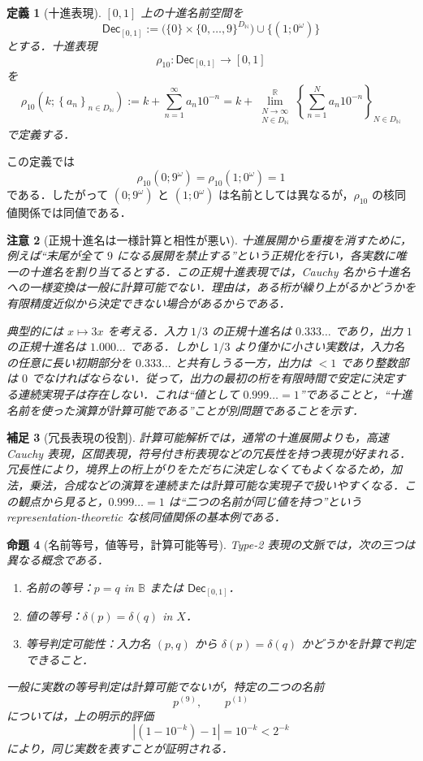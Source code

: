 \documentclass[a4paper,11pt]{ltjsarticle}
\theoremstyle{jpdef}
\newtheorem{definition}{定義}[section]
\newtheorem{remark}[definition]{補足}
\newtheorem{warning}[definition]{注意}
\theoremstyle{jpthm}
\newtheorem{proposition}[definition]{命題}
\newcommand{\N}{\mathbb{N}}
\newcommand{\R}{\mathbb{R}}
\newcommand{\DN}{D_{\N}}
\newcommand{\seq}[2]{\left\{#1\right\}_{#2}}
\newcommand{\Baire}{\mathbb{B}}
\begin{document}
\begin{definition}[十進表現]
\([0,1]\) 上の十進名前空間を
\[
  \mathsf{Dec}_{[0,1]}
  :=\bigl(\{0\}\times\{0,\ldots,9\}^{\DN}\bigr)\cup\{(1;0^\omega)\}
\]
とする．十進表現
\[
  \rho_{10}:\mathsf{Dec}_{[0,1]}\to[0,1]
\]
を
\[
  \rho_{10}(k;\seq{a_n}{n\in\DN})
  := k+\sum_{n=1}^{\infty}a_n10^{-n}
  =k+\lim_{\substack{N\to\infty\\N\in\DN}}^{\R}
      \seq{\sum_{n=1}^{N}a_n10^{-n}}{N\in\DN}
\]
で定義する．
\end{definition}

この定義では
\[
  \rho_{10}(0;9^\omega)=\rho_{10}(1;0^\omega)=1
\]
である．したがって \((0;9^\omega)\) と \((1;0^\omega)\) は名前としては異なるが，\(\rho_{10}\) の核同値関係では同値である．

\begin{warning}[正規十進名は一様計算と相性が悪い]
十進展開から重複を消すために，例えば``末尾が全て \(9\) になる展開を禁止する''という正規化を行い，各実数に唯一の十進名を割り当てるとする．この正規十進表現では，Cauchy 名から十進名への一様変換は一般に計算可能でない．理由は，ある桁が繰り上がるかどうかを有限精度近似から決定できない場合があるからである．

典型的には \(x\mapsto 3x\) を考える．入力 \(1/3\) の正規十進名は \(0.333\ldots\) であり，出力 \(1\) の正規十進名は \(1.000\ldots\) である．しかし \(1/3\) より僅かに小さい実数は，入力名の任意に長い初期部分を \(0.333\ldots\) と共有しうる一方，出力は \(<1\) であり整数部は \(0\) でなければならない．従って，出力の最初の桁を有限時間で安定に決定する連続実現子は存在しない．これは``値として \(0.999\ldots=1\)''であることと，``十進名前を使った演算が計算可能である''ことが別問題であることを示す．
\end{warning}

\begin{remark}[冗長表現の役割]
計算可能解析では，通常の十進展開よりも，高速 Cauchy 表現，区間表現，符号付き桁表現などの冗長性を持つ表現が好まれる．冗長性により，境界上の桁上がりをただちに決定しなくてもよくなるため，加法，乗法，合成などの演算を連続または計算可能な実現子で扱いやすくなる．この観点から見ると，\(0.999\ldots=1\) は``二つの名前が同じ値を持つ''という representation-theoretic な核同値関係の基本例である．
\end{remark}

\begin{proposition}[名前等号，値等号，計算可能等号]
Type-2 表現の文脈では，次の三つは異なる概念である．
\begin{enumerate}
\item 名前の等号：\(p=q\) in \(\Baire\) または \(\mathsf{Dec}_{[0,1]}\)．
\item 値の等号：\(\delta(p)=\delta(q)\) in \(X\)．
\item 等号判定可能性：入力名 \((p,q)\) から \(\delta(p)=\delta(q)\) かどうかを計算で判定できること．
\end{enumerate}
一般に実数の等号判定は計算可能でないが，特定の二つの名前
\[
  p^{(9)},\qquad p^{(1)}
\]
については，上の明示的評価
\[
  |(1-10^{-k})-1|=10^{-k}<2^{-k}
\]
により，同じ実数を表すことが証明される．
\end{proposition}
\end{document}

